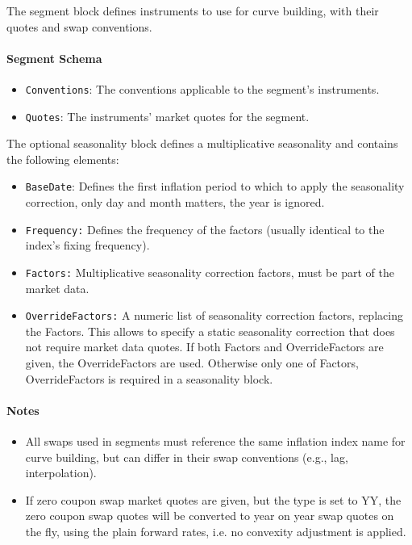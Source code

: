 The segment block defines instruments to use for curve building, with their quotes and swap conventions.

\paragraph{Segment Schema}
\begin{itemize}
\item {\tt Conventions}: The conventions applicable to the segment's instruments.
\item {\tt Quotes}: The instruments' market quotes for the segment.
\end{itemize}

The optional seasonality block defines a multiplicative seasonality and contains the following elements:

\begin{itemize}
\item {\tt BaseDate}: Defines the first inflation period to which to apply the seasonality correction, only day and
  month matters, the year is ignored.
\item {\tt Frequency:} Defines the frequency of the factors (usually identical to the index's fixing frequency).
\item {\tt Factors:} Multiplicative seasonality correction factors, must be part of the market data.
\item {\tt OverrideFactors:} A numeric list of seasonality correction factors, replacing the Factors. This allows to
  specify a static seasonality correction that does not require market data quotes. If both Factors and OverrideFactors
  are given, the OverrideFactors are used. Otherwise only one of Factors, OverrideFactors is required in a seasonality
  block.
\end{itemize}

\paragraph{Notes}
\begin{itemize}
\item All swaps used in segments must reference the same inflation index name for curve building, but can differ in their swap conventions (e.g., lag, interpolation).
\item If zero coupon swap market quotes are given, but the type is set to YY, the zero coupon swap quotes will be
converted to year on year swap quotes on the fly, using the plain forward rates, i.e. no convexity adjustment is
applied.
\end{itemize}

